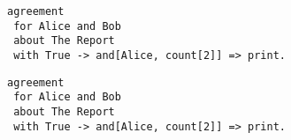 \lstset{language=Pucella2006}
\begin{lstlisting}[frame=single, caption={Expressible in ACCPL},label={lst:agreementExpressible}]
agreement
 for Alice and Bob 
 about The Report 
 with True -> and[Alice, count[2]] => print.
\end{lstlisting}

\lstset{language=Pucella2006}
\begin{lstlisting}[frame=single, caption={Expressible in ACCPL},label={lst:agreementExpressible}]
agreement
 for Alice and Bob 
 about The Report 
 with True -> and[Alice, count[2]] => print.
\end{lstlisting}

